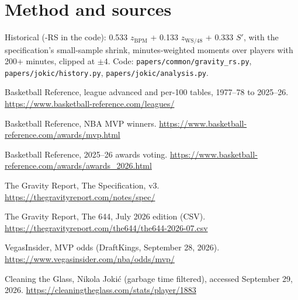 \documentclass[11pt]{article}
\begin{document}
\forecastscale
{}

\medskip\noindent{\footnotesize\textcolor{steel}{External predictions are graded by April 30,
2027 (BPM) and June 30, 2027 (MVP). Registered October 17, 2026, before the
October 18 freeze. Scored by Brier score in the Forecast Ledger.}}

\section*{Method and sources}
\small
\gravity{} Historical (\gravity-RS in the code): 0.533 $z_{\mathrm{BPM}}$ + 0.133 $z_{\mathrm{WS/48}}$ + 0.333 $S'$, with the
specification's small-sample shrink, minutes-weighted moments over players with 200+
minutes, clipped at $\pm 4$. Code: \texttt{papers/common/gravity\_rs.py},
\texttt{papers/jokic/history.py}, \texttt{papers/jokic/analysis.py}.
\begin{enumerate}[label={[\arabic*]}]
\item Basketball Reference, league advanced and per-100 tables, 1977--78 to 2025--26. \url{https://www.basketball-reference.com/leagues/}
\item Basketball Reference, NBA MVP winners. \url{https://www.basketball-reference.com/awards/mvp.html}
\item Basketball Reference, 2025--26 awards voting. \url{https://www.basketball-reference.com/awards/awards_2026.html}
\item The Gravity Report, The \gravity{} Specification, v3. \url{https://thegravityreport.com/notes/spec/}
\item The Gravity Report, The 644, July 2026 edition (CSV). \url{https://thegravityreport.com/the644/the644-2026-07.csv}
\item VegasInsider, MVP odds (DraftKings, September 28, 2026). \url{https://www.vegasinsider.com/nba/odds/mvp/}
\item Cleaning the Glass, Nikola Jokić (garbage time filtered), accessed September 29, 2026. \url{https://cleaningtheglass.com/stats/player/1883}
\end{enumerate}
\end{document}
